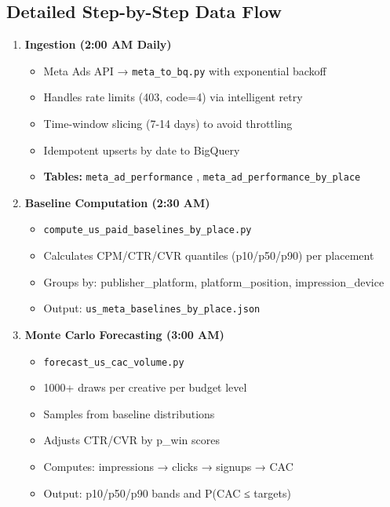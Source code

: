 \documentclass[11pt,a4paper]{report}
\newcommand{\codeinline}[1]{%
    \colorbox{aelpgray!10}{\texttt{#1}}%
}
\begin{document}
\subsection{Detailed Step-by-Step Data Flow}

\begin{enumerate}[leftmargin=*]
    \item \textbf{Ingestion (2:00 AM Daily)}
    \begin{itemize}
        \item Meta Ads API → \codeinline{meta\_to\_bq.py} with exponential backoff
        \item Handles rate limits (403, code=4) via intelligent retry
        \item Time-window slicing (7-14 days) to avoid throttling
        \item Idempotent upserts by date to BigQuery
        \item \textbf{Tables:} \codeinline{meta\_ad\_performance}, \codeinline{meta\_ad\_performance\_by\_place}
    \end{itemize}

    \item \textbf{Baseline Computation (2:30 AM)}
    \begin{itemize}
        \item \codeinline{compute\_us\_paid\_baselines\_by\_place.py}
        \item Calculates CPM/CTR/CVR quantiles (p10/p50/p90) per placement
        \item Groups by: publisher\_platform, platform\_position, impression\_device
        \item Output: \codeinline{us\_meta\_baselines\_by\_place.json}
    \end{itemize}

    \item \textbf{Monte Carlo Forecasting (3:00 AM)}
    \begin{itemize}
        \item \codeinline{forecast\_us\_cac\_volume.py}
        \item 1000+ draws per creative per budget level
        \item Samples from baseline distributions
        \item Adjusts CTR/CVR by p\_win scores
        \item Computes: impressions → clicks → signups → CAC
        \item Output: p10/p50/p90 bands and P(CAC ≤ targets)
    \end{itemize}


\end{enumerate}
\end{document}
